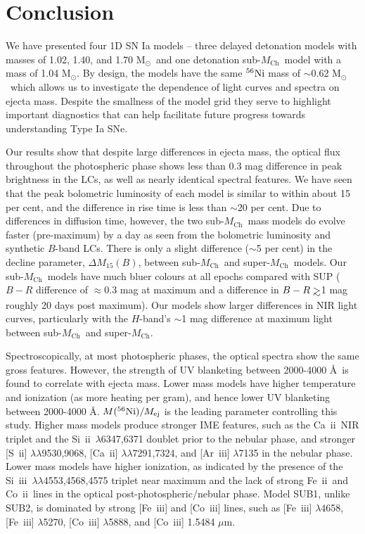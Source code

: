\documentclass[useAMS,usenatbib,useasmath]{mnras}
\newcommand{\Mch}{\hbox{$M_{\text{Ch}}$}}
\newcommand{\Msun}{\hbox{M$_\odot$}}
\newcommand{\elem}[2][default]{$^{#1}{\rm #2}$}
\def\gtrsim{\mathrel{\hbox{\rlap{\hbox{\lower4pt\hbox{$\sim$}}}\hbox{$>$}}}}
\newcommand{\caii}{\mbox{Ca~{\sc ii}}}
\newcommand{\ariii}{\mbox{Ar~{\sc iii}}}
\newcommand{\skii}{\mbox{Si~{\sc ii}}}
\newcommand{\skiii}{\mbox{Si~{\sc iii}}}
\newcommand{\feii}{\mbox{Fe~{\sc ii}}}
\newcommand{\feiii}{\mbox{Fe~{\sc iii}}}
\newcommand{\coii}{\mbox{Co~{\sc ii}}}
\newcommand{\coiii}{\mbox{Co~{\sc iii}}}
\newcommand{\sii}{\mbox{S~{\sc ii}}}
\newcommand{\lb}{$\lambda$}
\begin{document}
 
%
\section{Conclusion}\label{Conclusion}%
We have presented four 1D SN Ia models -- three delayed detonation models with masses of  1.02, 1.40, and 1.70 \Msun\ and one detonation sub-\Mch\ model with a mass of 1.04 \Msun. By design, the models have the same \elem[56]{Ni} mass of $\sim$0.62 \Msun\ which allows us to investigate the dependence of light curves and spectra on ejecta mass. Despite the smallness of  the model grid they serve to highlight important diagnostics that can help facilitate future progress towards understanding Type Ia SNe.

Our results show that despite large differences in ejecta mass, the optical flux throughout the photospheric phase shows less than 0.3 mag difference in peak brightness in the LCs, as well as nearly identical spectral features. We have seen that the peak bolometric luminosity of each model is similar to within about 15 per cent, and the difference in rise time is less than $\sim$20 per cent. Due to differences in diffusion time, however, the two sub-\Mch\ mass models do evolve faster (pre-maximum) by a day as seen from the bolometric luminosity and synthetic $B$-band LCs. There is only a slight difference ($\sim$5 per cent) in the decline parameter, $\Delta M_{15}(B)$, between sub-\Mch\ and super-\Mch\ models. Our sub-\Mch\ models have much bluer colours at all epochs compared with SUP ($B-R$ difference of $\approx 0.3$ mag at maximum and a difference in $B-R\gtrsim$1 mag roughly 20 days post maximum). Our models show larger differences in NIR light curves, particularly with the $H$-band's $\sim$1 mag difference at maximum light between sub-\Mch\ and super-\Mch.

Spectroscopically,  at most photospheric phases, the optical spectra show the same gross features. However, the strength of UV blanketing between 2000-4000 \AA\ is found to correlate with ejecta mass. Lower mass models have higher temperature and ionization (as more heating per gram), and hence lower UV blanketing between 2000-4000 \AA. $M(^{56}{\rm Ni})/M_{\rm ej}$ is the leading parameter controlling this study. Higher mass models produce stronger IME features, such as the \caii\ NIR triplet and the \skii\ \lb6347,6371 doublet prior to the nebular phase, and stronger [\sii] \lb\lb9530,9068, [\caii] \lb\lb7291,7324, and [\ariii] \lb7135 in the nebular phase. Lower mass models have higher ionization, as indicated by the presence of the \skiii\ \lb\lb4553,4568,4575 triplet near maximum and the lack of strong \feii\ and \coii\ lines in the optical post-photospheric/nebular phase. Model SUB1, unlike SUB2, is dominated by strong [\feiii] and [\coiii] lines, such as [\feiii] \lb4658, [\feiii] \lb5270, [\coiii] \lb5888, and [\coiii] 1.5484 $\mu$m. 
\end{document}
